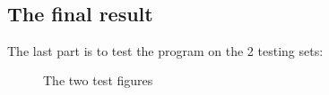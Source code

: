 \documentclass{article}
\begin{document}
\\


	\subsection{The final result}
	The last part is to test the program on the 2 testing sets:
	\begin{figure}[h!]%
		\centering
    	\caption{The two test figures}%
    	\label{fig:test}%
	\end{figure}
	
\end{document}
